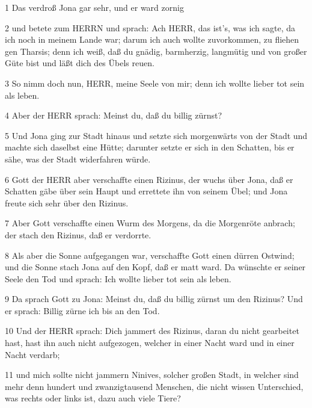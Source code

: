 \par 1 Das verdroß Jona gar sehr, und er ward zornig
\par 2 und betete zum HERRN und sprach: Ach HERR, das ist's, was ich sagte, da ich noch in meinem Lande war; darum ich auch wollte zuvorkommen, zu fliehen gen Tharsis; denn ich weiß, daß du gnädig, barmherzig, langmütig und von großer Güte bist und läßt dich des Übels reuen.
\par 3 So nimm doch nun, HERR, meine Seele von mir; denn ich wollte lieber tot sein als leben.
\par 4 Aber der HERR sprach: Meinst du, daß du billig zürnst?
\par 5 Und Jona ging zur Stadt hinaus und setzte sich morgenwärts von der Stadt und machte sich daselbst eine Hütte; darunter setzte er sich in den Schatten, bis er sähe, was der Stadt widerfahren würde.
\par 6 Gott der HERR aber verschaffte einen Rizinus, der wuchs über Jona, daß er Schatten gäbe über sein Haupt und errettete ihn von seinem Übel; und Jona freute sich sehr über den Rizinus.
\par 7 Aber Gott verschaffte einen Wurm des Morgens, da die Morgenröte anbrach; der stach den Rizinus, daß er verdorrte.
\par 8 Als aber die Sonne aufgegangen war, verschaffte Gott einen dürren Ostwind; und die Sonne stach Jona auf den Kopf, daß er matt ward. Da wünschte er seiner Seele den Tod und sprach: Ich wollte lieber tot sein als leben.
\par 9 Da sprach Gott zu Jona: Meinst du, daß du billig zürnst um den Rizinus? Und er sprach: Billig zürne ich bis an den Tod.
\par 10 Und der HERR sprach: Dich jammert des Rizinus, daran du nicht gearbeitet hast, hast ihn auch nicht aufgezogen, welcher in einer Nacht ward und in einer Nacht verdarb;
\par 11 und mich sollte nicht jammern Ninives, solcher großen Stadt, in welcher sind mehr denn hundert und zwanzigtausend Menschen, die nicht wissen Unterschied, was rechts oder links ist, dazu auch viele Tiere?

